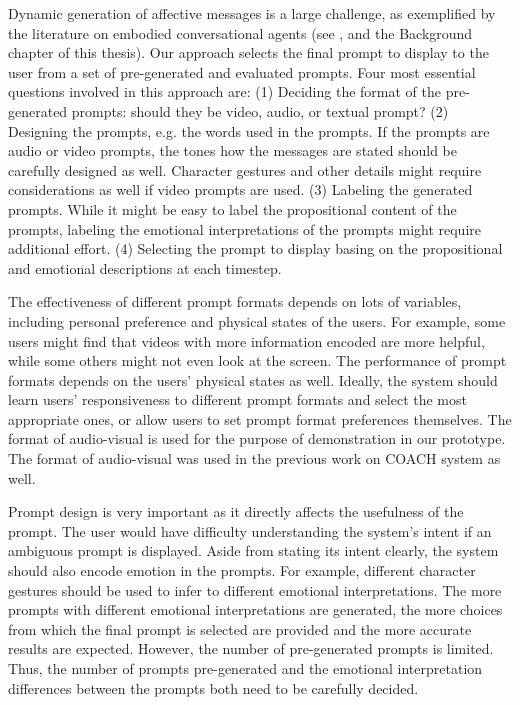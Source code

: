 Dynamic generation of affective messages is a large challenge, as exemplified by the literature on embodied conversational agents (see \cite{cassell2000embodied, niewiadomski2013computational}, and the Background chapter of this thesis). Our approach selects the final prompt to display to the user from a set of pre-generated and evaluated prompts. Four most essential questions involved in this approach are: (1) Deciding the format of the pre-generated prompts: should they be video, audio, or textual prompt? (2) Designing the prompts, e.g. the words used in the prompts. If the prompts are audio or video prompts, the tones how the messages are stated should be carefully designed as well. Character gestures and other details might require considerations as well if video prompts are used. (3) Labeling the generated prompts. While it might be easy to label the propositional content of the prompts, labeling the emotional interpretations of the prompts might require additional effort. (4) Selecting the prompt to display basing on the propositional and emotional descriptions at each timestep. 

The effectiveness of different prompt formats depends on lots of variables, including personal preference and physical states of the users. For example, some users might find that videos with more information encoded are more helpful, while some others might not even look at the screen. The performance of prompt formats depends on the users' physical states as well. Ideally, the system should learn users' responsiveness to different prompt formats and select the most appropriate ones, or allow users to set prompt format preferences themselves. The format of audio-visual is used for the purpose of demonstration in our prototype. The format of audio-visual was used in the previous work on COACH system as well.

Prompt design is very important as it directly affects the usefulness of the prompt. The user would have difficulty understanding the system's intent if an ambiguous prompt is displayed. Aside from stating its intent clearly, the system should also encode emotion in the prompts. For example, different character gestures should be used to infer to different emotional interpretations. The more prompts with different emotional interpretations are generated, the more choices from which the final prompt is selected are provided and the more accurate results are expected. However, the number of pre-generated prompts is limited. Thus, the number of prompts pre-generated and the emotional interpretation differences between the prompts both need to be carefully decided. 


